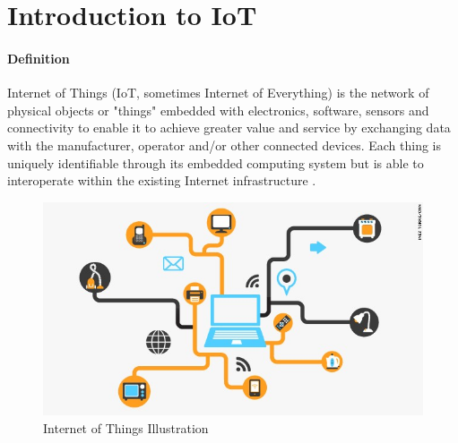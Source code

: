\documentclass[12pt]{article}
\begin{document}
\maketitle

\section {Introduction to IoT}
\paragraph {Definition} Internet of Things (IoT, sometimes Internet of Everything) is the network of physical objects or "things" embedded with electronics, software, sensors and connectivity to enable it to achieve greater value and service by exchanging data with the manufacturer, operator and/or other connected devices. Each thing is uniquely identifiable through its embedded computing system but is able to interoperate within the existing Internet infrastructure \cite{wiki}.

\begin{figure}
\caption[width=10mm]{Internet of Things Illustration}
\includegraphics{iot}

\end{figure}
\end{document}

